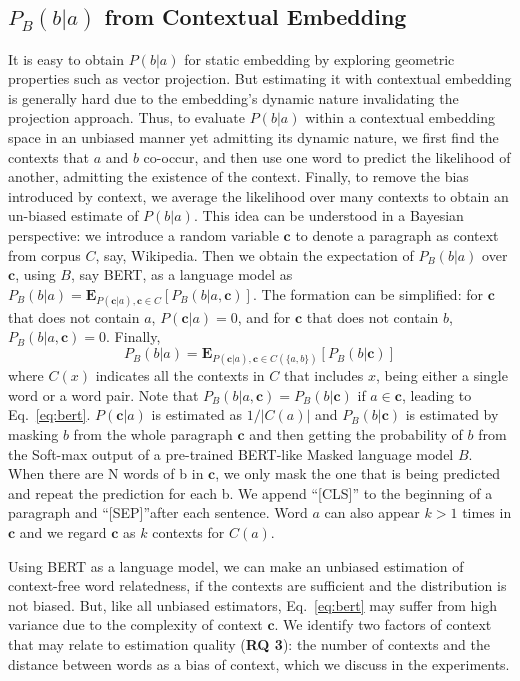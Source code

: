 \documentclass[letterpaper]{article} %
\begin{document}
\subsection{$P_B(b|a)$ from Contextual Embedding}
It is easy to obtain $P(b|a)$ for static embedding by exploring geometric properties such as vector projection. But estimating it with contextual embedding is generally hard due to the embedding's dynamic nature invalidating the projection approach.
Thus, to evaluate $P(b|a)$ within a contextual embedding space in an unbiased manner yet admitting its dynamic nature, we first find the contexts that $a$ and $b$ co-occur, and then use one word to predict the likelihood of another, admitting the existence of the context. Finally, to remove the bias introduced by context, we average the likelihood over many contexts to obtain an un-biased estimate of $P(b|a)$. This idea can be understood in a Bayesian perspective: we introduce a random variable $\textbf{c}$ to denote a paragraph as context from corpus $C$, say, Wikipedia. Then we obtain the expectation of $P_B(b|a)$ over $\mathbf{c}$, using $B$, say BERT, as a language model as $P_B(b|a)= \mathbf{E}_{P(\mathbf{c}|a), \mathbf{c} \in C} [P_B(b|a,\mathbf{c})]$. The formation can be simplified: for $\textbf{c}$ that does not contain $a$, $P(\textbf{c}|a)=0$, and for $\textbf{c}$ that does not contain $b$, $P_B(b|a,\textbf{c})=0$. Finally,
\begin{equation} \label{eq:bert}
    P_B(b|a)=\mathbf{E}_{P(\mathbf{c}|a), \mathbf{c} \in C(\{a,b\})} [P_B(b|\mathbf{c})]
\end{equation}
where $C(x)$ indicates all the contexts in $C$ that includes $x$, being either a single word or a word pair. Note that $P_B(b|a,\mathbf{c})=P_B(b|\mathbf{c})$ if $a\in \mathbf{c}$, leading to Eq.~\ref{eq:bert}. $P(\textbf{c}|a)$ is estimated as $1/|C(a)|$ and $P_B(b|\textbf{c})$ is estimated by masking $b$ from the whole paragraph $\textbf{c}$ and then getting the probability of $b$ from the Soft-max output of a pre-trained BERT-like Masked language model $B$. When there are N words of b in $\mathbf{c}$, we only mask the one that is being predicted and repeat the prediction for each b. We append ``[CLS]'' to the beginning of a paragraph and ``[SEP]''after each sentence. Word $a$ can also appear $k>1$ times in $\mathbf{c}$ and we regard $\mathbf{c}$ as $k$ contexts for $C(a)$.

Using BERT as a language model, we can make an unbiased estimation of context-free word relatedness, if the contexts are sufficient and the distribution is not biased. But, like all unbiased estimators, Eq.~\ref{eq:bert} may suffer from high variance due to the complexity of context $\textbf{c}$. We identify two factors of context that may relate to estimation quality (\textbf{RQ 3}): the number of contexts and the distance between words as a bias of context, which we discuss in the experiments.
\end{document}
